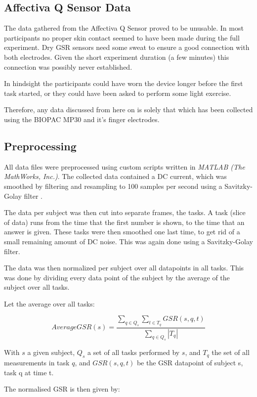 \documentclass[11pt,leqno,a4paper]{report} %
\begin{document}
\subsection{Affectiva Q Sensor Data}
The data gathered from the Affectiva Q Sensor proved to be unusable. In most participants no proper skin contact seemed to have been made during the full experiment. Dry GSR sensors need some sweat to ensure a good connection with both electrodes. Given the short experiment duration (a few minutes) this connection was possibly never established.

In hindsight the participants could have worn the device longer before the first task started, or they could have been asked to perform some light exercise. 

Therefore, any data discussed from here on is solely that which has been collected using the BIOPAC MP30 and it's finger electrodes.


\subsection{Preprocessing}
All data files were preprocessed using custom scripts written in \emph{MATLAB (The MathWorks, Inc.)}. The collected data contained a DC current, which was smoothed by filtering and resampling to 100 samples per second using a Savitzky-Golay filter \citep{savitzky1964smoothing}. 

The data per subject was then cut into separate frames, the tasks. A task (slice of data) runs from the time that the first number is shown, to the time that an answer is given. These tasks were then smoothed one last time, to get rid of a small remaining amount of DC noise. This was again done using a Savitzky-Golay filter.

The data was then normalized per subject over all datapoints in all tasks. This was done by dividing every data point of the subject by the average of the subject over all tasks. 

Let the average over all tasks:


\[
AverageGSR(s) = \frac 
{\sum_{q \in Q_s}\sum_{t \in T_q} GSR(s,q,t)}
{ \sum_{q \in Q_s} \left\vert{T_q}\right\vert }
\]

With $s$ a given subject, $Q_s$ a set of all tasks performed by $s$, and $T_q$ the set of all measurements in task $q$, and $GSR(s,q,t)$ be the GSR datapoint of subject s, task q at time t.

The normalised GSR is then given by:
\end{document}
